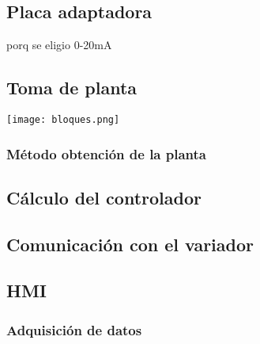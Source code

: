 \subsection{Placa adaptadora}
porq se eligio 0-20mA

\subsection{Toma de planta}
\begin{center}
\texttt{[image: bloques.png]}
\end{center}
\label{fig:bloques}

    \subsubsection{Método obtención de la planta}
\subsection{Cálculo del controlador}
\subsection{Comunicación con el variador}
\subsection{HMI}
    \subsubsection{Adquisición de datos}